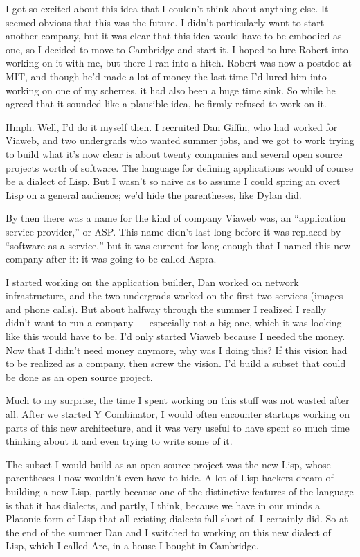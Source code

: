 \documentclass[12pt]{book}
\begin{document}
I got so excited about this idea that I couldn't think about anything
else. It seemed obvious that this was the future. I didn't particularly
want to start another company, but it was clear that this idea would
have to be embodied as one, so I decided to move to Cambridge and start
it. I hoped to lure Robert into working on it with me, but there I ran
into a hitch. Robert was now a postdoc at MIT, and though he'd made a
lot of money the last time I'd lured him into working on one of my
schemes, it had also been a huge time sink. So while he agreed that it
sounded like a plausible idea, he firmly refused to work on it.

Hmph. Well, I'd do it myself then. I recruited Dan Giffin, who had
worked for Viaweb, and two undergrads who wanted summer jobs, and we got
to work trying to build what it's now clear is about twenty companies
and several open source projects worth of software. The language for
defining applications would of course be a dialect of Lisp. But I wasn't
so naive as to assume I could spring an overt Lisp on a general
audience; we'd hide the parentheses, like Dylan did.

By then there was a name for the kind of company Viaweb was, an
``application service provider,'' or ASP. This name didn't last long
before it was replaced by ``software as a service,'' but it was current
for long enough that I named this new company after it: it was going to
be called Aspra.

I started working on the application builder, Dan worked on network
infrastructure, and the two undergrads worked on the first two services
(images and phone calls). But about halfway through the summer I
realized I really didn't want to run a company --- especially not a big
one, which it was looking like this would have to be. I'd only started
Viaweb because I needed the money. Now that I didn't need money anymore,
why was I doing this? If this vision had to be realized as a company,
then screw the vision. I'd build a subset that could be done as an open
source project.

Much to my surprise, the time I spent working on this stuff was not
wasted after all. After we started Y Combinator, I would often encounter
startups working on parts of this new architecture, and it was very
useful to have spent so much time thinking about it and even trying to
write some of it.

The subset I would build as an open source project was the new Lisp,
whose parentheses I now wouldn't even have to hide. A lot of Lisp
hackers dream of building a new Lisp, partly because one of the
distinctive features of the language is that it has dialects, and
partly, I think, because we have in our minds a Platonic form of Lisp
that all existing dialects fall short of. I certainly did. So at the end
of the summer Dan and I switched to working on this new dialect of Lisp,
which I called Arc, in a house I bought in Cambridge.
\end{document}
